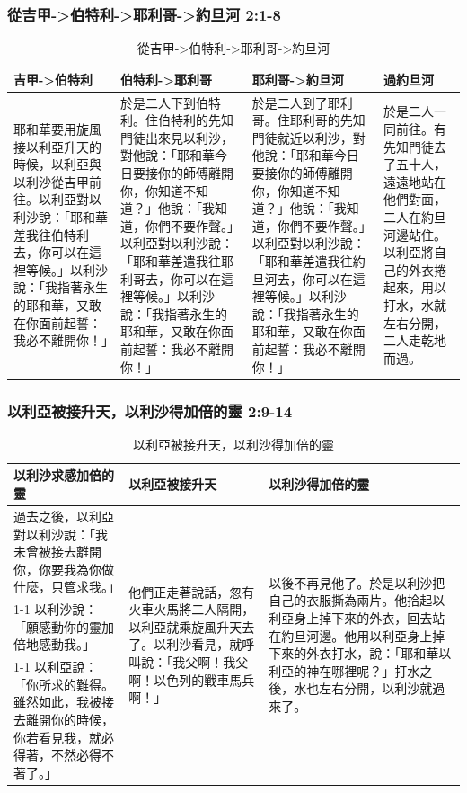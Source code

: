 \subsubsection{從吉甲->伯特利->耶利哥->約旦河 2:1-8}
\begin{table}[H]
\centering
\begin{tabular}{p{3.75cm}|p{5.1cm}|p{5.1cm}|p{2.95cm}}\hline\hline
吉甲->伯特利&伯特利->耶利哥&耶利哥->約旦河&過約旦河\\\hline\hline
耶和華要用旋風接以利亞升天的時候，以利亞與以利沙從吉甲前往。以利亞對以利沙說：「耶和華差我往伯特利去，你可以在這裡等候。」以利沙說：「我指著永生的耶和華，又敢在你面前起誓：我必不離開你！」&於是二人下到伯特利。住伯特利的先知門徒出來見以利沙，對他說：「耶和華今日要接你的師傅離開你，你知道不知道？」他說：「我知道，你們不要作聲。」以利亞對以利沙說：「耶和華差遣我往耶利哥去，你可以在這裡等候。」以利沙說：「我指著永生的耶和華，又敢在你面前起誓：我必不離開你！」
&於是二人到了耶利哥。住耶利哥的先知門徒就近以利沙，對他說：「耶和華今日要接你的師傅離開你，你知道不知道？」他說：「我知道，你們不要作聲。」以利亞對以利沙說：「耶和華差遣我往約旦河去，你可以在這裡等候。」以利沙說：「我指著永生的耶和華，又敢在你面前起誓：我必不離開你！」
&於是二人一同前往。有先知門徒去了五十人，遠遠地站在他們對面，二人在約旦河邊站住。以利亞將自己的外衣捲起來，用以打水，水就左右分開，二人走乾地而過。
\\\hline
\end{tabular}
\caption{從吉甲->伯特利->耶利哥->約旦河}
\end{table}


\subsubsection{以利亞被接升天，以利沙得加倍的靈 2:9-14}
\begin{table}[H]
\centering
\begin{tabular}{p{}|p{3.85cm}|p{}}\hline\hline
以利沙求感加倍的靈&以利亞被接升天&以利沙得加倍的靈\\\hline\hline
過去之後，以利亞對以利沙說：「我未曾被接去離開你，你要我為你做什麼，只管求我。」
&\multirow{3}{4.cm}{他們正走著說話，忽有火車火馬將二人隔開，以利亞就乘旋風升天去了。以利沙看見，就呼叫說：「我父啊！我父啊！以色列的戰車馬兵啊！」}
&\multirow{3}{6.1cm}{以後不再見他了。於是以利沙把自己的衣服撕為兩片。他拾起以利亞身上掉下來的外衣，回去站在約旦河邊。他用以利亞身上掉下來的外衣打水，說：「耶和華以利亞的神在哪裡呢？」打水之後，水也左右分開，以利沙就過來了。}\\\cline{1-1}
以利沙說：「願感動你的靈加倍地感動我。」&&\\\cline{1-1}
以利亞說：「你所求的難得。雖然如此，我被接去離開你的時候，你若看見我，就必得著，不然必得不著了。」&&\\\hline
\end{tabular}
\caption{以利亞被接升天，以利沙得加倍的靈}
\end{table}


